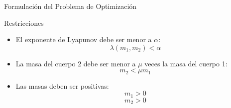 \begin{frame}{Formulación del Problema de Optimización}
\begin{block}{Restricciones}
  \begin{itemize}
      \item El exponente de Lyapunov debe ser menor a $\alpha$:
      $$ \lambda(m_1, m_2) < \alpha $$ %
      \item La masa del cuerpo 2 debe ser menor a $\mu$ veces la masa del cuerpo 1:
      $$ m_2 < \mu m_1 $$ %
      \item Las masas deben ser positivas:
      $$ m_1 > 0 $$ %
      $$ m_2 > 0 $$ %
  \end{itemize}
\end{block}

\end{frame}